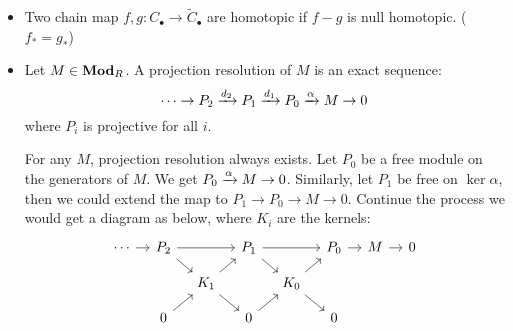 \begin{definition}
\begin{itemize}
      \begin{prop} \label{prop:null-homotopic-then-fstar-is-zero}
      If $f$ is null homotopic, then $f_* = 0$.
      \begin{proof}
        $f_*(x) = \tilde{d}_{n+1} s_{n}(x) + s_{n-1} d_{n}(x) =
        \tilde{d}_{n+1} s_n (x) \in B_n(\tilde{C}_\bullet) \implies f_*(\bar{x}) = 0$.
      \end{proof}
      \end{prop}
    \item Two chain map $f, g: C_\bullet \to \tilde C_\bullet$ are homotopic
      if $f - g$ is null homotopic. ($f_* = g_*$)
    \item Let $M \in \mathbf{Mod}_R$. A projection resolution of $M$ is an exact sequence:
      \[
        \dotsm \to P_2 \xrightarrow{d_2} P_1 \xrightarrow{d_1} P_0 \xrightarrow{\alpha} M \to 0
      \]
      where $P_i$ is projective for all $i$.

      For any $M$, projection resolution always exists.
      Let $P_0$ be a free module on the generators of $M$.
      We get $P_0 \xrightarrow{\alpha} M \to 0$. Similarly, let $P_1$ be
      free on $\ker \alpha$, then we could extend the map to
      $P_1 \to P_0 \to M \to 0$. Continue the process we would
      get a diagram as below, where $K_i$ are the kernels:
      \[
        \begin{tikzcd}[sep=10pt]
          \cdots \ar[r] & P_2 \ar[rr] \ar[rd] && P_1 \ar[rr] \ar[rd] && P_0 \ar[r] & M \ar[r] & 0 \\
                        & & K_1 \ar[ru] \ar[rd] && K_0 \ar[ru] \ar[rd] \\
                        & 0 \ar[ru] && 0 \ar[ru] && 0
        \end{tikzcd}
      \]
  \end{itemize}
\end{definition}

